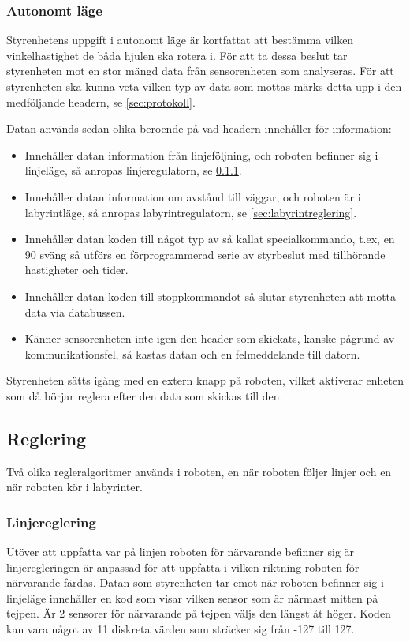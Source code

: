 \subsubsection{Autonomt läge}

Styrenhetens uppgift i autonomt läge är kortfattat att bestämma vilken vinkelhastighet de båda hjulen ska rotera i. 
För att ta dessa beslut tar styrenheten mot en stor mängd data från sensorenheten som analyseras.
För att styrenheten ska kunna veta vilken typ av data som mottas märks detta upp i den
medföljande headern, se \ref{sec:protokoll}. 

Datan används sedan olika beroende på vad headern innehåller för information:
 
 \begin{itemize}
 
\item Innehåller datan information från linjeföljning, och roboten befinner sig i linjeläge, 
så anropas linjeregulatorn, se \ref{sec:linjereglering}.

\item Innehåller datan information om avstånd till väggar, och roboten är i labyrintläge,
 så anropas labyrintregulatorn, se \ref{sec:labyrintreglering}.

\item Innehåller datan koden till något typ av så kallat specialkommando, t.ex, en 90\degree 
sväng så utförs en förprogrammerad serie av styrbeslut med tillhörande hastigheter och tider.

\item Innehåller datan koden till stoppkommandot så slutar styrenheten att motta data via databussen.

\item Känner sensorenheten inte igen den header som skickats, kanske pågrund av kommunikationsfel,
så kastas datan och en felmeddelande till datorn.

\end{itemize}

Styrenheten sätts igång med en extern knapp på roboten, vilket aktiverar enheten som då börjar
reglera efter den data som skickas till den.


\subsection{Reglering}
Två olika regleralgoritmer används i roboten, en när roboten följer linjer och
en när roboten kör i labyrinter.
\subsubsection{Linjereglering}
\label{sec:linjereglering}
Utöver att uppfatta var på linjen roboten för närvarande befinner sig är 
linjeregleringen är anpassad för att uppfatta i vilken riktning roboten för 
närvarande färdas. Datan som styrenheten tar emot när roboten befinner sig i 
linjeläge innehåller en kod som visar vilken sensor som är närmast mitten på 
tejpen. Är 2 sensorer för närvarande på tejpen väljs den längst åt höger. 
Koden kan vara något av 11 diskreta värden som sträcker sig från -127 till 127.

